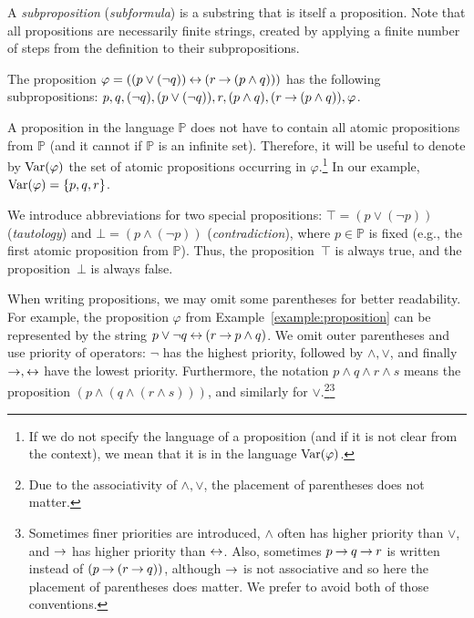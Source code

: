 A \emph{subproposition} (\emph{subformula}) is a substring that is itself a proposition. Note that all propositions are necessarily finite strings, created by applying a finite number of steps from the definition to their subpropositions.

\begin{example}\label{example:proposition}
The proposition $\varphi = ((p \lor (\neg q)) \mathbin{\leftrightarrow} (r \mathbin{\rightarrow} (p \land q)))$ has the following subpropositions: $p, q, (\neg q), (p \lor (\neg q)), r, (p \land q), (r \mathbin{\rightarrow} (p \land q)), \varphi$.
\end{example}

A proposition in the language $\mathbb P$ does not have to contain all atomic propositions from $\mathbb P$ (and it cannot if $\mathbb P$ is an infinite set). Therefore, it will be useful to denote by $\operatorname{Var}(\varphi)$ the set of atomic propositions occurring in $\varphi$.\footnote{If we do not specify the language of a proposition (and if it is not clear from the context), we mean that it is in the language $\operatorname{Var}(\varphi)$.} In our example, $\operatorname{Var}(\varphi)=\{p, q, r\}$.

We introduce abbreviations for two special propositions: $\top = (p \lor (\neg p))$ (\emph{tautology}) and $\bot = (p \land (\neg p))$ (\emph{contradiction}), where $p \in \mathbb P$ is fixed (e.g., the first atomic proposition from $\mathbb P$). Thus, the proposition~$\top$ is always true, and the proposition~$\bot$ is always false.

When writing propositions, we may omit some parentheses for better readability. For example, the proposition $\varphi$ from Example~\ref{example:proposition} can be represented by the string
$p \lor \neg q \mathbin{\leftrightarrow} (r \mathbin{\rightarrow} p \land q)$. We omit outer parentheses and use priority of operators: $\neg$ has the highest priority, followed by $\land, \lor$, and finally $\mathbin{\rightarrow}, \mathbin{\leftrightarrow}$ have the lowest priority. Furthermore, the notation $p \land q \land r \land s$ means the proposition $(p \land (q \land (r \land s)))$, and similarly for $\lor$.\footnote{Due to the associativity of $\land, \lor$, the placement of parentheses does not matter.}\footnote{Sometimes finer priorities are introduced, $\land$ often has higher priority than $\lor$, and $\mathbin{\rightarrow}$ has higher priority than $\mathbin{\leftrightarrow}$. Also, sometimes $p \mathbin{\rightarrow} q \mathbin{\rightarrow} r$ is written instead of $(p \mathbin{\rightarrow} (r \mathbin{\rightarrow} q))$, although $\mathbin{\rightarrow}$ is not associative and so here the placement of parentheses does matter. We prefer to avoid both of those conventions.}

